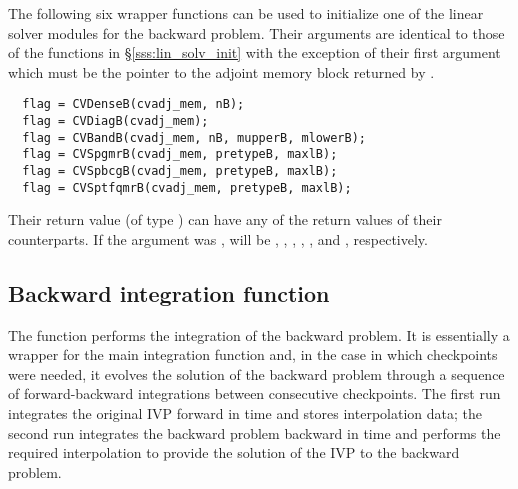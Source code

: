 The following six wrapper functions can be used to initialize one of the linear
solver modules for the backward problem. Their arguments are identical to those
of the functions in \S\ref{sss:lin_solv_init} with the exception of their first
argument which must be the pointer to the adjoint memory block returned by
.
\begin{verbatim}
  flag = CVDenseB(cvadj_mem, nB);
  flag = CVDiagB(cvadj_mem);
  flag = CVBandB(cvadj_mem, nB, mupperB, mlowerB);
  flag = CVSpgmrB(cvadj_mem, pretypeB, maxlB);
  flag = CVSpbcgB(cvadj_mem, pretypeB, maxlB);
  flag = CVSptfqmrB(cvadj_mem, pretypeB, maxlB);
\end{verbatim}
Their return value  (of type ) can have any of the return values 
of their counterparts.
If the  argument was ,  will be
, , 
, , 
, and , respectively.

\subsection{Backward integration function}
\label{sss:cvodeb}

The function  performs the integration of the backward problem.
It is essentially a wrapper for the {\cvodes} main integration function 
 and, in the case in which checkpoints were needed, it evolves 
the solution of the backward problem through a sequence of forward-backward 
integrations between consecutive checkpoints. 
The first run integrates the original IVP forward in time and
stores interpolation data; the second run integrates the backward problem 
backward in time and performs the required interpolation to provide
the solution of the IVP to the backward problem.

